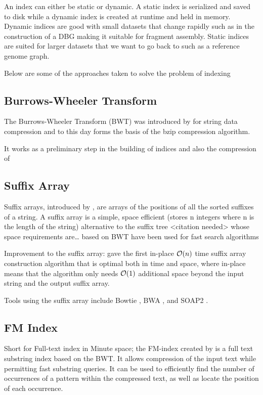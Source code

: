 \documentclass[11pt]{article}
\begin{document}
An index can either be static or dynamic. A static index is serialized and saved
to disk while a dynamic index is created at runtime and held in memory. Dynamic
indices are good with small datasets that change rapidly such as in the
construction of a DBG making it suitable for fragment assembly. Static indices 
are suited for larger datasets that we want to go back to such as a reference
genome graph.

Below are some of the approaches taken to solve the problem of indexing
\subsection{Burrows-Wheeler Transform}
\label{sec:org5e8f284}
The Burrows-Wheeler Transform (BWT) was introduced by
\cite{burrowsBlocksortingLosslessData1994} for string data 
compression and to this day forms the basis of the bzip compression algorithm.

It works as a preliminary step in the building of indices and also the 
compression of 

\subsection{Suffix Array}
\label{sec:org132c193}
Suffix arrays, introduced by \cite{manberSuffixArraysNew1990}, are arrays of the
positions of all the sorted suffixes of a string.
A suffix array is a simple, space efficient
(stores n integers where n is the length of the string) alternative to the
suffix tree <citation needed> whose space requirements are\ldots{}
based on BWT have been used for fast search algorithms

Improvement to the suffix array: \cite{liMinimapMiniasmFast2016}
gave the first in-place \(\mathcal{O}(n)\) time suffix array construction algorithm that
is optimal both in time and space, where in-place means that the algorithm only
needs \(\mathcal{O}(1)\) additional space beyond the input string and the output suffix
array.

Tools using the suffix array include Bowtie
\cite{langmeadUltrafastMemoryefficientAlignment2009}, BWA
\cite{liFastAccurateShort2009}, 
and SOAP2 \cite{liSOAP2ImprovedUltrafast2009}.

\subsection{FM Index}
\label{sec:org1642cb9}
Short for Full-text index in Minute space; the FM-index created
by \cite{ferraginaOpportunisticDataStructures2000} is a full text substring index
based on the BWT. It allows compression of the input text while permitting fast
substring queries. It can be used to efficiently find the number of occurrences
of a pattern within the compressed text, as well as locate the position of each
occurrence.
\end{document}
